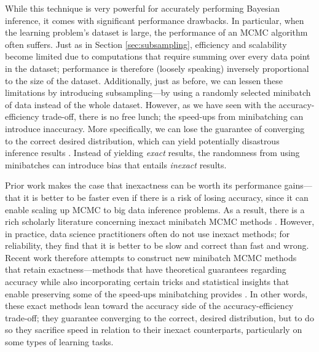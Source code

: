 \documentclass[sigplan,screen]{acmart}
\begin{document}
While this technique is very powerful for accurately performing Bayesian inference, it comes with significant performance drawbacks. In particular, when the learning problem's dataset is large, the performance of an MCMC algorithm often suffers. Just as in Section \ref{sec:subsampling}, efficiency and scalability become limited due to computations that require summing over every data point in the dataset; performance is therefore (loosely speaking) inversely proportional to the size of the dataset. Additionally, just as before, we can lessen these limitations by introducing subsampling---by using a randomly selected minibatch of data instead of the whole dataset. However, as we have seen with the accuracy-efficiency trade-off, there is no free lunch; the speed-ups from minibatching can introduce inaccuracy. More specifically, we can lose the guarantee of converging to the correct desired distribution, which can yield potentially disastrous inference results \cite{zhang2020tunamh}. Instead of yielding \emph{exact} results, the randomness from using minibatches can introduce bias that entails \emph{inexact} results.

Prior work makes the case that inexactness can be worth its performance gains---that it is better to be faster even if there is a risk of losing accuracy, since it can enable scaling up MCMC to big data inference problems. As a result, there is a rich scholarly literature concerning inexact minibatch MCMC methods  \cite{chen2014stochastic,korattikara2014austerity, seita2016efficient}. However, in practice, data science practitioners often do not use inexact methods; for reliability, they find that it is better to be slow and correct than fast and wrong. Recent work therefore attempts to construct new minibatch MCMC methods that retain exactness---methods that have theoretical guarantees regarding accuracy while also incorporating certain tricks and statistical insights that enable preserving some of the speed-ups minibatching provides \cite{maclaurin2015firefly, zhang2019poisson, zhang2020amagold, cornish2019scalable, zhang2020tunamh}. In other words, these exact methods lean toward the accuracy side of the accuracy-efficiency trade-off; they guarantee converging to the correct, desired distribution, but to do so they sacrifice speed in relation to their inexact counterparts, particularly on some types of learning tasks.
\end{document}
